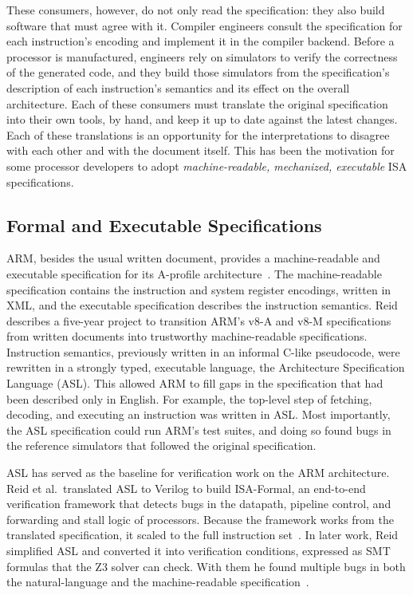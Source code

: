 These consumers, however, do not only read the specification: they also
build software that must agree with it. Compiler engineers consult the
specification for each instruction's encoding and implement it in the
compiler backend. Before a processor is manufactured, engineers rely on
simulators to verify the correctness of the generated code, and they build
those simulators from the specification's description of each instruction's
semantics and its effect on the overall architecture. 
Each of these consumers must translate the original specification into their own
tools, by hand, and keep it up to date against the latest changes. Each of these
translations is an opportunity
for the interpretations to disagree with each other and with the document
itself. This has been the motivation for some processor developers to adopt
\emph{machine-readable, mechanized, executable} ISA specifications.

\subsection{Formal and Executable Specifications}
\label{sec:formal-isa}

ARM, besides the usual written document, provides a machine-readable and
executable specification for its A-profile architecture~\cite{arm-spec}. The
machine-readable specification contains the instruction and system register
encodings, written in XML, and the executable specification describes the
instruction semantics. Reid~\cite{reid-trustworthy-specs} describes a five-year project to
transition ARM's v8-A and v8-M specifications from written documents
into trustworthy machine-readable specifications.
Instruction semantics, previously written in an informal C-like pseudocode,
were rewritten in a strongly typed, executable language, the Architecture
Specification Language (ASL). This allowed ARM to fill gaps in the
specification that had been described only in English. For example, the
top-level step of fetching, decoding, and executing an instruction was
written in ASL. Most importantly, the ASL specification could run ARM's test
suites, and doing so found bugs in the reference simulators that followed
the original specification.

ASL has served as the baseline for verification work on the ARM
architecture. Reid et al.\ translated ASL to Verilog to build ISA-Formal, an
end-to-end verification framework that detects bugs in the datapath,
pipeline control, and forwarding and stall logic of processors. Because the
framework works from the translated specification, it scaled to the full
instruction set~\cite{reid-isa-formal}. In later work, Reid simplified ASL
and converted it into verification conditions, expressed as SMT formulas
that the Z3 solver can check. With them he found multiple bugs in both the
natural-language and the machine-readable
specification~\cite{reid-who-guards}.

